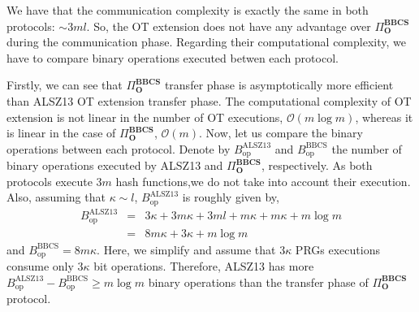 We have that the communication complexity is exactly the same in both protocols: $\sim 3ml$. So, the OT extension does not have any advantage over $\Pi^{\textbf{BBCS}}_{\textbf{O}}$ during the communication phase. Regarding their computational complexity, we have to compare binary operations executed betwen each protocol.

Firstly, we can see that $\Pi^{\textbf{BBCS}}_{\textbf{O}}$ transfer phase is asymptotically more efficient than ALSZ13 OT extension transfer phase. The computational complexity of OT extension is not linear in the number of OT executions, $\mathcal{O}(m\log m)$, whereas it is linear in the case of $\Pi^{\textbf{BBCS}}_{\textbf{O}}$, $\mathcal{O}(m)$. Now, let us compare the binary operations between each protocol. Denote by $B_{\text{op}}^\text{ALSZ13}$ and $B_{\text{op}}^\text{BBCS}$ the number of binary operations executed by ALSZ13 and $\Pi^{\textbf{BBCS}}_{\textbf{O}}$, respectively. As both protocols execute $3m$ hash functions,we do not take into account their execution. Also, assuming that $\kappa \sim l$, $B_{\text{op}}^\text{ALSZ13}$ is roughly given by,
\begin{eqnarray*}
    B_{\text{op}}^\text{ALSZ13} &=& 3\kappa + 3m\kappa + 3 m l + m\kappa + m\kappa + m \log m \\
    &=& 8 m \kappa + 3 \kappa + m\log m 
\end{eqnarray*}
and $B_{\text{op}}^\text{BBCS} = 8 m \kappa$. Here, we simplify and assume that $3\kappa$ PRGs executions consume only $3\kappa$ bit operations. Therefore, ALSZ13 has more $B_{\text{op}}^\text{ALSZ13} - B_{\text{op}}^\text{BBCS}  \geq m\log m $ binary operations than the transfer phase of $\Pi^{\textbf{BBCS}}_{\textbf{O}}$ protocol. 


